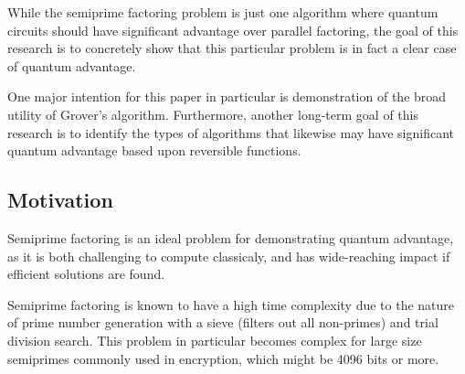 \documentclass[twocolumn]{cinc}
\begin{document}
  While the semiprime factoring problem is just one algorithm where quantum circuits 
  should have significant advantage over parallel factoring, 
  the goal of this research is to concretely show that this particular problem is 
  in fact a clear case of quantum advantage.

  One major intention for this paper in particular is demonstration of the broad 
  utility of Grover's algorithm. %
  Furthermore, another long-term goal of this research is to identify the types of algorithms that 
  likewise may have significant quantum advantage based upon reversible functions.

  \subsection{Motivation}

  Semiprime factoring is an ideal problem for demonstrating quantum advantage,
  as it is both challenging to compute classicaly, and has wide-reaching
  impact if efficient solutions are found.

  Semiprime factoring is known to have a high time complexity due to the nature of
  prime number generation with a sieve (filters out all non-primes) and trial division search.
  This problem in particular becomes complex for large size semiprimes commonly used in 
  encryption, which might be 4096 bits or more. 
\end{document}
